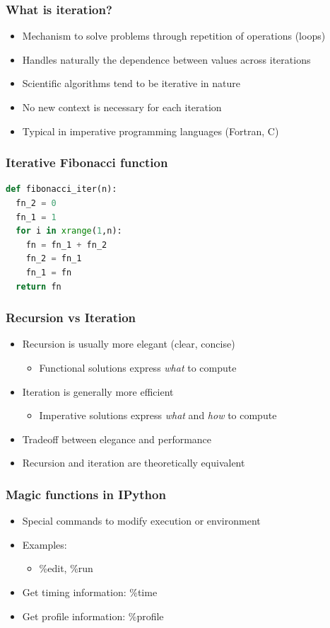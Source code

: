 \documentclass[xcolor=table,10pt,final]{beamer}
\begin{document}
\begin{frame}
	\frametitle{What is iteration?}
	\begin{itemize}
		\item Mechanism to solve problems through repetition of operations (loops)
		\item Handles naturally the dependence between values across iterations
		\item Scientific algorithms tend to be iterative in nature
		\item No new context is necessary for each iteration
		\item Typical in imperative programming languages (Fortran, C)
	\end{itemize}
\end{frame}

\begin{frame}[fragile]
	\frametitle{Iterative Fibonacci function}
	\begin{lstlisting}[language=Python]
def fibonacci_iter(n):
  fn_2 = 0
  fn_1 = 1
  for i in xrange(1,n):
    fn = fn_1 + fn_2
    fn_2 = fn_1
    fn_1 = fn
  return fn
	\end{lstlisting}
\end{frame}

\begin{frame}
	\frametitle{Recursion vs Iteration}
	\begin{itemize}
		\item Recursion is usually more elegant (clear, concise)
		\begin{itemize}
			\item Functional solutions express \emph{what} to compute
		\end{itemize}
		\item Iteration is generally more efficient
		\begin{itemize}
			\item Imperative solutions express \emph{what} and \emph{how} to compute
		\end{itemize}
		\item Tradeoff between elegance and performance
		\item Recursion and iteration are theoretically equivalent 
	\end{itemize}
\end{frame}

\begin{frame}
	\frametitle{Magic functions in IPython}
	\begin{itemize}
		\item Special commands to modify execution or environment
		\item Examples:
		\begin{itemize}
			\item \%edit, \%run
		\end{itemize}
		\item Get timing information: \%time
		\item Get profile information: \%profile
	\end{itemize}
\end{frame}
\end{document}
